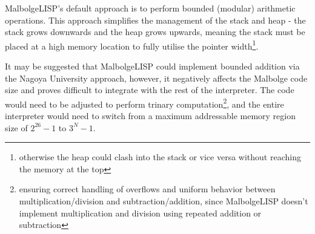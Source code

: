 \par MalbolgeLISP's default approach is to perform bounded (modular) arithmetic operations. This approach simplifies the management of the stack and heap - the stack grows downwards and the heap grows upwards, meaning the stack must be placed at a high memory location to fully utilise the pointer width\footnote{otherwise the heap could clash into the stack or vice versa without reaching the memory at the top}.

\par It may be suggested that MalbolgeLISP could implement bounded addition via the Nagoya University approach, however, it negatively affects the Malbolge code size and proves difficult to integrate with the rest of the interpreter. The code would need to be adjusted to perform trinary computation\footnote{ensuring correct handling of overflows and uniform behavior between multiplication/division and subtraction/addition, since MalbolgeLISP doesn't implement multiplication and division using repeated addition or subtraction}, and the entire interpreter would need to switch from a maximum addressable memory region size of $2^{26} - 1$ to $3^N - 1$.
